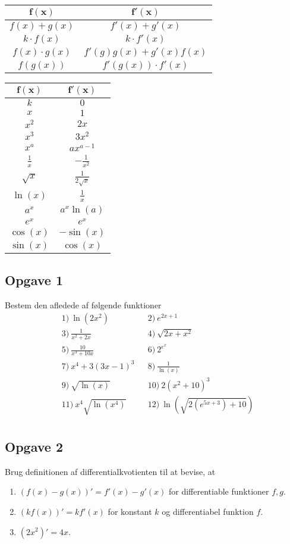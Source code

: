 \begin{center}
	\begin{tabular}{c|c}
		$\boldsymbol{f(x)}$ & $\boldsymbol{f'(x)}$\\
		\hline
		$f(x)+g(x)$ & $f'(x) + g'(x)$\\
		\hline
		$k\cdot f(x)$ & $k\cdot f'(x)$\\
		\hline
		$f(x)\cdot g(x)$ & $f'(g)g(x) + g'(x)f(x)$\\
		\hline
		$f(g(x))$ & $f'(g(x))\cdot f'(x)$ 
	\end{tabular}
	\hspace{1.5cm}
	\begin{tabular}{c|c}
		$\boldsymbol{f(x)}$ & $\boldsymbol{f'(x)}$\\
		\hline
		$k$ & $0$\\
		\hline
		$x$ & $1$\\
		\hline 
		$x^2$ & $2x$\\
		\hline
		$x^3$ & $3x^2$\\
		\hline
		$x^a$ & $ax^{a-1}$\\
		\hline 
		$\frac{1}{x}$ & $-\frac{1}{x^2}$\\
		\hline
		$\sqrt{x}$ & $\frac{1}{2\sqrt{x}}$ \\
		\hline
		$\ln(x)$ & $\frac{1}{x}$\\
		\hline
		$a^x$ & $a^x\ln(a)$\\
		\hline 
		$e^x$ & $e^x$\\
		\hline 
		$\cos(x)$ & $-\sin(x)$\\
		\hline
		$\sin(x)$ & $\cos(x)$
	\end{tabular}
\end{center}


\subsection*{Opgave 1}
Bestem den afledede af følgende funktioner
\begin{align*}
&1) \  \ln(2x^2)   &&2) \  e^{2x+1}   \\
&3) \  \frac{1}{x^2+2x}  &&4) \  \sqrt{2x+x^2}   \\
&5) \  \frac{10}{x^3+10x}   &&6) \ 2^{e^x}    \\
&7) \  x^4+3(3x-1)^3   &&8) \  \frac{1}{\ln(x)}   \\
&9) \   \sqrt{\ln(x)}  &&10) \ 2(x^2+10)^3   \\
&11) \   x^4\sqrt{\ln(x^4)}  &&12) \  \ln(\sqrt{2(e^{5x+3})+10})  \\
\end{align*}
\subsection*{Opgave 2}
Brug definitionen af differentialkvotienten til at bevise, at
\begin{enumerate}[label=\roman*)]
\item $(f(x)-g(x))' = f'(x)-g'(x)$ for differentiable funktioner $f,g$.
\item $(kf(x))' = kf'(x)$ for konstant $k$ og differentiabel funktion $f$.
\item $(2x^2)' = 4x$. 
\end{enumerate}